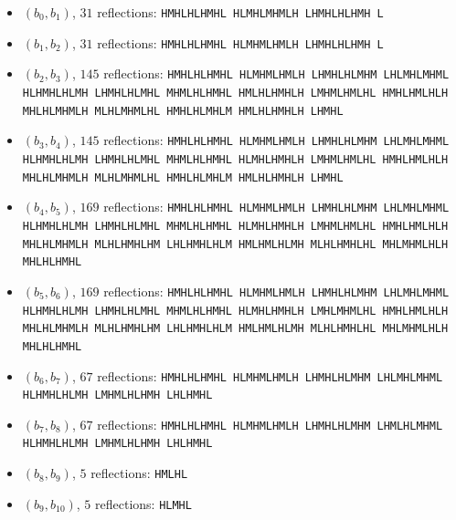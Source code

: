\begin{itemize}\setlength\itemsep{1pt}\small\raggedright
\item[1.] $(b_{0}, b_{1})$, $31$ reflections: \texttt{HMHLHLHMHL\,\allowbreak HLMHLMHMLH\,\allowbreak LHMHLHLHMH\,\allowbreak L}
\item[2.] $(b_{1}, b_{2})$, $31$ reflections: \texttt{HMHLHLHMHL\,\allowbreak HLMHMLHMLH\,\allowbreak LHMHLHLHMH\,\allowbreak L}
\item[3.] $(b_{2}, b_{3})$, $145$ reflections: \texttt{HMHLHLHMHL\,\allowbreak HLMHMLHMLH\,\allowbreak LHMHLHLMHM\,\allowbreak LHLMHLMHML\,\allowbreak HLHMHLHLMH\,\allowbreak LHMHLHLMHL\,\allowbreak MHMLHLHMHL\,\allowbreak HMLHLHMHLH\,\allowbreak LMHMLHMLHL\,\allowbreak HMHLHMLHLH\,\allowbreak MHLHLMHMLH\,\allowbreak MLHLMHMLHL\,\allowbreak HMHLHLMHLM\,\allowbreak HMLHLHMHLH\,\allowbreak LHMHL}
\item[4.] $(b_{3}, b_{4})$, $145$ reflections: \texttt{HMHLHLHMHL\,\allowbreak HLMHMLHMLH\,\allowbreak LHMHLHLMHM\,\allowbreak LHLMHLMHML\,\allowbreak HLHMHLHLMH\,\allowbreak LHMHLHLMHL\,\allowbreak MHMLHLHMHL\,\allowbreak HLMHLHMHLH\,\allowbreak LMHMLHMLHL\,\allowbreak HMHLHMLHLH\,\allowbreak MHLHLMHMLH\,\allowbreak MLHLMHMLHL\,\allowbreak HMHLHLMHLM\,\allowbreak HMLHLHMHLH\,\allowbreak LHMHL}
\item[5.] $(b_{4}, b_{5})$, $169$ reflections: \texttt{HMHLHLHMHL\,\allowbreak HLMHMLHMLH\,\allowbreak LHMHLHLMHM\,\allowbreak LHLMHLMHML\,\allowbreak HLHMHLHLMH\,\allowbreak LHMHLHLMHL\,\allowbreak MHMLHLHMHL\,\allowbreak HLMHLHMHLH\,\allowbreak LMHMLHMLHL\,\allowbreak HMHLHMLHLH\,\allowbreak MHLHLMHMLH\,\allowbreak MLHLHMHLHM\,\allowbreak LHLHMHLHLM\,\allowbreak HMLHMLHLMH\,\allowbreak MLHLHMHLHL\,\allowbreak MHLMHMLHLH\,\allowbreak MHLHLHMHL}
\item[6.] $(b_{5}, b_{6})$, $169$ reflections: \texttt{HMHLHLHMHL\,\allowbreak HLMHMLHMLH\,\allowbreak LHMHLHLMHM\,\allowbreak LHLMHLMHML\,\allowbreak HLHMHLHLMH\,\allowbreak LHMHLHLMHL\,\allowbreak MHMLHLHMHL\,\allowbreak HLMHLHMHLH\,\allowbreak LMHLMHMLHL\,\allowbreak HMHLHMLHLH\,\allowbreak MHLHLMHMLH\,\allowbreak MLHLHMHLHM\,\allowbreak LHLHMHLHLM\,\allowbreak HMLHMLHLMH\,\allowbreak MLHLHMHLHL\,\allowbreak MHLMHMLHLH\,\allowbreak MHLHLHMHL}
\item[7.] $(b_{6}, b_{7})$, $67$ reflections: \texttt{HMHLHLHMHL\,\allowbreak HLMHMLHMLH\,\allowbreak LHMHLHLMHM\,\allowbreak LHLMHLMHML\,\allowbreak HLHMHLHLMH\,\allowbreak LMHMLHLHMH\,\allowbreak LHLHMHL}
\item[8.] $(b_{7}, b_{8})$, $67$ reflections: \texttt{HMHLHLHMHL\,\allowbreak HLMHMLHMLH\,\allowbreak LHMHLHLMHM\,\allowbreak LHMLHLMHML\,\allowbreak HLHMHLHLMH\,\allowbreak LMHMLHLHMH\,\allowbreak LHLHMHL}
\item[9.] $(b_{8}, b_{9})$, $5$ reflections: \texttt{HMLHL}
\item[10.] $(b_{9}, b_{10})$, $5$ reflections: \texttt{HLMHL}
\end{itemize}
